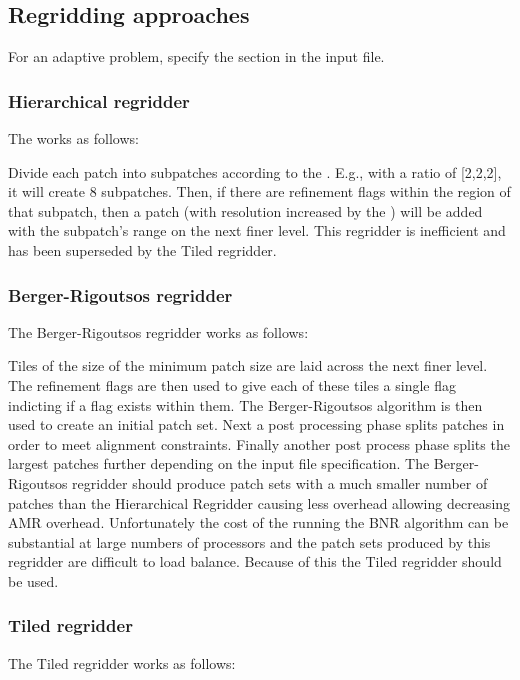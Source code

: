\subsection{Regridding approaches}
For an adaptive problem, specify the  section in the input
file.
 
\subsubsection{Hierarchical regridder}
The  works as follows: 

Divide each patch into subpatches according to the
. E.g., with a ratio of [2,2,2], it will
create 8 subpatches. Then, if there are refinement flags within the
region of that subpatch, then a patch (with resolution increased by
the ) will be added with the subpatch's range on
the next finer level. This regridder is inefficient and has been
superseded by the Tiled regridder.

\subsubsection{Berger-Rigoutsos regridder}
The Berger-Rigoutsos regridder works as follows: 

Tiles of the size of the minimum patch size are laid across the next
finer level. The refinement flags are then used to give each of these
tiles a single flag indicting if a flag exists within them. The
Berger-Rigoutsos algorithm is then used to create an initial patch
set. Next a post processing phase splits patches in order to meet
alignment constraints. Finally another post process phase splits the
largest patches further depending on the  input
file specification. The Berger-Rigoutsos regridder should produce
patch sets with a much smaller number of patches than the Hierarchical
Regridder causing less overhead allowing decreasing AMR
overhead. Unfortunately the cost of the running the BNR algorithm can
be substantial at large numbers of processors and the patch sets
produced by this regridder are difficult to load balance. Because of
this the Tiled regridder should be used.

\subsubsection{Tiled regridder}
The Tiled regridder works as follows: 

